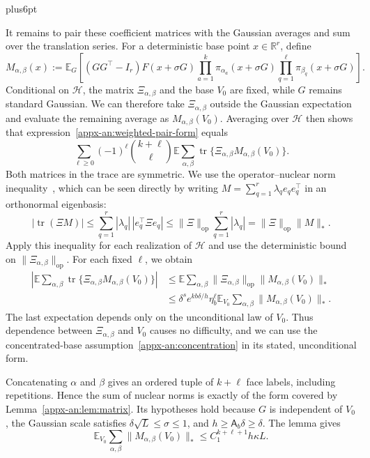 \documentclass[11pt,letterpaper,twoside,leqno]{article}
\makeatletter
\theoremstyle{bookplain}
\theoremstyle{bookremark}
\renewenvironment{proof}[1][\proofname]{\par
  \pushQED{\qed}\normalfont\topsep6pt plus6pt\relax
  \trivlist\item[\hskip\labelsep\bfseries #1\@addpunct{.}]\ignorespaces
}{\popQED\endtrivlist\@endpefalse}
\newcommand{\E}{\mathbb E}
\newcommand{\R}{\mathbb R}
\newcommand{\tr}{\operatorname{tr}}
\newcommand{\op}{\mathrm{op}}
\makeatother
\begin{document}
\begin{proof}
It remains to pair these coefficient matrices with the Gaussian
averages and sum over the translation series. For a deterministic
base point $x\in\R^r$, define
\[
 M_{\alpha,\beta}(x):=
 \E_G\left[(GG^\top-I_r)F(x+\sigma G)
       \prod_{a=1}^k\pi_{\alpha_a}(x+\sigma G)
       \prod_{q=1}^\ell\pi_{\beta_q}(x+\sigma G)\right].
\]
Conditional on $\mathcal H$, the matrix $\Xi_{\alpha,\beta}$
and the base $V_0$ are fixed, while $G$ remains standard Gaussian.
We can therefore take $\Xi_{\alpha,\beta}$ outside the Gaussian
expectation and evaluate the remaining average as
$M_{\alpha,\beta}(V_0)$. Averaging over $\mathcal H$ then shows
that expression~\eqref{appx-an:weighted-pair-form} equals
\[
 \sum_{\ell\ge0}(-1)^\ell\binom{k+\ell}{\ell}
       \E\sum_{\alpha,\beta}
       \tr\{\Xi_{\alpha,\beta}M_{\alpha,\beta}(V_0)\}.
\]
Both matrices in the trace are symmetric. We use the
operator--nuclear norm inequality~\cite[Chapter~IV]{Bhatia1997},
which can be seen directly by writing
$M=\sum_{q=1}^r\lambda_q e_qe_q^\top$ in an orthonormal
eigenbasis:
\[
 |\tr(\Xi M)|
 \le\sum_{q=1}^r|\lambda_q|\,|e_q^\top\Xi e_q|
 \le\|\Xi\|_{\op}\sum_{q=1}^r|\lambda_q|
 =\|\Xi\|_{\op}\|M\|_*.
\]
Apply this inequality for each realization of $\mathcal H$
and use the deterministic bound on $\|\Xi_{\alpha,\beta}\|_{\op}$.
For each fixed $\ell$, we obtain
\[
 \begin{aligned}
 \left|\E\sum_{\alpha,\beta}
       \tr\{\Xi_{\alpha,\beta}M_{\alpha,\beta}(V_0)\}\right|
 &\le\E\sum_{\alpha,\beta}
       \|\Xi_{\alpha,\beta}\|_{\op}
       \|M_{\alpha,\beta}(V_0)\|_*\\
 &\le\delta^s e^{kb\delta/h}\eta_b^\ell
       \E_{V_0}\sum_{\alpha,\beta}
       \|M_{\alpha,\beta}(V_0)\|_*.
 \end{aligned}
\]
The last expectation depends only on the unconditional law of
$V_0$. Thus dependence between $\Xi_{\alpha,\beta}$ and $V_0$
causes no difficulty, and we can use the concentrated-base
assumption~\eqref{appx-an:concentration} in its stated,
unconditional form.

Concatenating $\alpha$ and $\beta$ gives an ordered tuple of
$k+\ell$ face labels, including repetitions. Hence the sum of
nuclear norms is exactly of the form covered by
Lemma~\ref{appx-an:lem:matrix}. Its hypotheses hold because
$G$ is independent of $V_0$, the Gaussian scale satisfies
$\delta\sqrt L\le\sigma\le1$, and
$h\ge\mathsf A_b\delta\ge\delta$. The lemma gives
\[
 \E_{V_0}\sum_{\alpha,\beta}\|M_{\alpha,\beta}(V_0)\|_*
 \le C_1^{k+\ell+1}h\kappa L.
\]


\end{proof}
\end{document}
